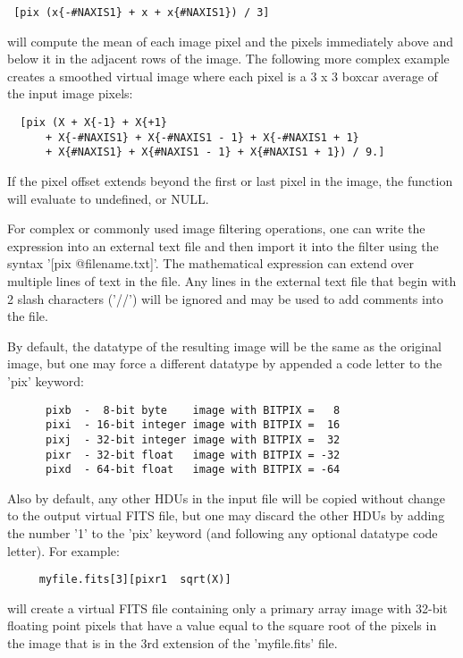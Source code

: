 \documentclass[11pt]{book}
\begin{document}
\begin{verbatim}
 [pix (x{-#NAXIS1} + x + x{#NAXIS1}) / 3]
\end{verbatim}
will compute the mean of each image pixel and the pixels immediately
above and below it in the adjacent rows of the image.
The following more complex example
creates a smoothed virtual image where each pixel
is a 3 x 3 boxcar average of the input image pixels:

\begin{verbatim}
  [pix (X + X{-1} + X{+1}
      + X{-#NAXIS1} + X{-#NAXIS1 - 1} + X{-#NAXIS1 + 1}
      + X{#NAXIS1} + X{#NAXIS1 - 1} + X{#NAXIS1 + 1}) / 9.]
\end{verbatim}
If the pixel offset
extends beyond the first or last pixel in the image, the function will
evaluate to undefined, or NULL.

For  complex  or commonly used image filtering operations,
one  can  write the expression into an external text  file and
then import it  into the
filter using  the syntax '[pix @filename.txt]'.   The mathematical
expression can
extend over multiple lines of text in the  file.
Any lines in the external text file
that begin with 2 slash characters ('//') will be ignored and may be
used to add comments into the file.

By default, the datatype of the resulting image will be the same as
the original image, but one may force a different datatype by appended
a code letter to the 'pix' keyword:

\begin{verbatim}
      pixb  -  8-bit byte    image with BITPIX =   8
      pixi  - 16-bit integer image with BITPIX =  16
      pixj  - 32-bit integer image with BITPIX =  32
      pixr  - 32-bit float   image with BITPIX = -32
      pixd  - 64-bit float   image with BITPIX = -64
\end{verbatim}
Also by default, any other HDUs in the input file will be copied without
change to the
output virtual FITS file, but one may discard the other HDUs by adding
the number '1' to the 'pix' keyword (and following any optional datatype code
letter).  For example:

\begin{verbatim}
     myfile.fits[3][pixr1  sqrt(X)]
\end{verbatim}
will create a virtual FITS file containing only a primary array image
with 32-bit floating point pixels that have a value equal to the square
root of the pixels in the image that is in the 3rd extension
of the 'myfile.fits' file.
\end{document}
